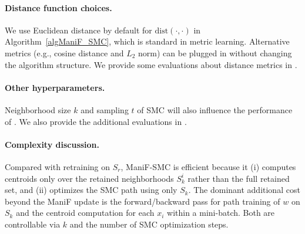 \paragraph{Distance function choices.}
We use Euclidean distance by default for $\mathrm{dist}(\cdot,\cdot)$ in Algorithm~\ref{algManiF_SMC}, which is standard in metric learning. Alternative metrics (e.g., cosine distance and $L_2$ norm) can be plugged in without changing the algorithm structure. We provide some evaluations about distance metrics in .


\paragraph{Other hyperparameters.}
Neighborhood size $k$ and sampling $t$ of SMC will also influence the performance of . We also provide the additional evaluations in .


\paragraph{Complexity discussion.}
Compared with retraining on $S_r$, ManiF-SMC is efficient because it (i) computes centroids only over the retained neighborhoods $S_k^i$ rather than the full retained set, and (ii) optimizes the SMC path using only $S_k$. The dominant additional cost beyond the ManiF update is the forward/backward pass for path training of $w$ on $S_k$ and the centroid computation for each $x_i$ within a mini-batch. Both are controllable via $k$ and the number of SMC optimization steps.

 


 \begin{table}[h]
	\scriptsize
	\caption{Dataset statistics.} 
	\label{dataset_table}
\vspace{-2mm}
\end{table}

